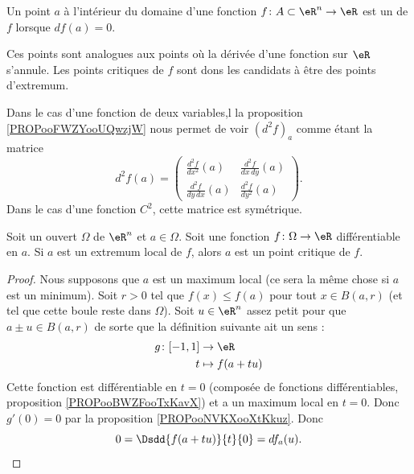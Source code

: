 \begin{definition}      \label{DEFooYJLZooLkEAYf}
Un point $a$ à l'intérieur du domaine d'une fonction $f\colon A\subset\eR^n\to \eR$ est un  de $f$ lorsque $df(a)=0$. 
\end{definition}

Ces points sont analogues aux points où la dérivée d'une fonction sur $\eR$ s'annule. Les points critiques de $f$ sont dons les candidats à être des points d'extremum.

Dans le cas d'une fonction de deux variables,l la proposition \ref{PROPooFWZYooUQwzjW} nous permet de voir \( (d^2f)_a\) comme étant la matrice 
\begin{equation}
    d^2f(a)=\begin{pmatrix}
    \frac{ d^2f  }{ dx^2 }(a)   &   \frac{ d^2f  }{ dx\,dy }(a) \\ 
    \frac{ d^2f  }{ dy\,dx }(a)     &   \frac{ d^2f  }{ dy^2 }(a)
\end{pmatrix}.
\end{equation}
Dans le cas d'une fonction $C^2$, cette matrice est symétrique.

\begin{proposition} \label{PropUQRooPgJsuz}
    Soit un ouvert \( \Omega\) de \( \eR^n\) et \( a\in \Omega\). Soit une fonction \( f\colon \Omega\to \eR\) différentiable en \( a\). Si \( a\) est un extremum local de \( f\), alors \( a\) est un point critique de \( f\).
\end{proposition}

\begin{proof}
    Nous supposons que \( a\) est un maximum local (ce sera la même chose si \( a\) est un minimum). Soit \( r>0\) tel que \( f(x)\leq f(a)\) pour tout \( x\in B(a,r)\) (et tel que cette boule reste dans \( \Omega\)). Soit \( u\in \eR^n\) assez petit pour que \( a\pm u\in B(a,r)\) de sorte que la définition suivante ait un sens :
    \begin{equation}
        \begin{aligned}
            g\colon \mathopen[ -1 , 1 \mathclose]&\to \eR \\
            t&\mapsto f(a+tu) 
        \end{aligned}
    \end{equation}
    Cette fonction est différentiable en \( t=0\) (composée de fonctions différentiables, proposition \ref{PROPooBWZFooTxKavX}) et a un maximum local en \( t=0\). Donc \( g'(0)=0\) par la proposition \ref{PROPooNVKXooXtKkuz}. Donc
    \begin{equation}
        0=\Dsdd{ f(a+tu) }{t}{0}=df_a(u).
    \end{equation}
\end{proof}

